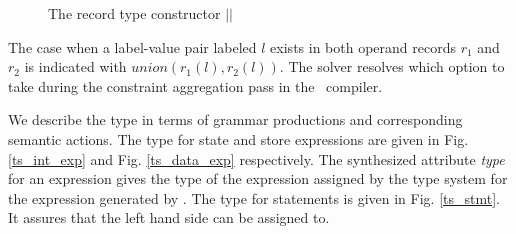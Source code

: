 \begin{figure}%
\noindent{}
\caption{The record type constructor $||$\label{rec_construc}}
\end{figure}

The case when a label-value pair labeled $l$ exists in both operand records $r_1$ and $r_2$ is indicated with $union(r_1(l),r_2(l))$. The  solver resolves which option to take during the constraint aggregation pass in the \ak\ compiler.

We describe the type  in terms of grammar productions and corresponding semantic actions. The type  for state and store expressions are given in Fig. \ref{ts_int_exp} and Fig. \ref{ts_data_exp} respectively. The synthesized attribute \emph{type} for an expression  gives the type of the expression assigned by the type system for the expression generated by . The type  for statements is given in Fig. \ref{ts_stmt}. It assures that the left hand side can be assigned to.


